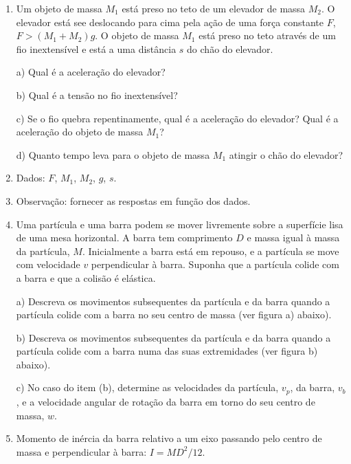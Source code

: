\begin{enumerate}[start=1,label={\bfseries Q\arabic*.}]
\item Um objeto de massa $M_{1}$ está preso no teto de um elevador de massa $M_{2}$. O elevador está see deslocando para cima pela ação de uma força constante $F$, $F > (M_{1} + M_{2})g$. O objeto de massa $M_{1}$ está preso no teto através de um fio inextensível e está a uma distância $s$ do chão do elevador.

a) Qual é a aceleração do elevador?

\resposta

b) Qual é a tensão no fio inextensível?

\resposta

c) Se o fio quebra repentinamente, qual é a aceleração do elevador? Qual é a aceleração do objeto de massa $M_{1}$?

\resposta

d) Quanto tempo leva para o objeto de massa $M_{1}$ atingir o chão do elevador?

\item[] Dados: $F$, $M_{1}$, $M_{2}$, $g$, $s$.
\item[] Observação: fornecer as respostas em função dos dados.




\item Uma partícula e uma barra podem se mover livremente sobre a superfície lisa de uma mesa horizontal. A barra tem comprimento $D$ e massa igual à massa da partícula, $M$. Inicialmente a barra está em repouso, e a partícula se move com velocidade $v$ perpendicular à barra. Suponha que a partícula colide com a barra e que a colisão é elástica.

a) Descreva os movimentos subsequentes da partícula e da barra quando a partícula colide com a barra no seu centro de massa (ver figura a) abaixo).

\resposta

b) Descreva os movimentos subsequentes da partícula e da barra quando a partícula colide com a barra numa das suas extremidades (ver figura b) abaixo).

\resposta

c) No caso do item (b), determine as velocidades da partícula, $v_{p}$, da barra, $v_{b}$, e a velocidade angular de rotação da barra em torno do seu centro de massa, $w$.

\item[] Momento de inércia da barra relativo a um eixo passando pelo centro de massa e perpendicular à barra: $I = MD^{2}/12$.


\end{enumerate}
